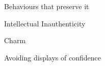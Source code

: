 \documentclass[aspectratio=169]{beamer}
\begin{document}
\begin{frame}
  \begin{center}
    \Huge Behaviours that preserve it
  \end{center}
\end{frame}

\begin{frame}
  \begin{center}
    \Huge Intellectual Inauthenticity
    \\ \small \cite{clanceimes78}
  \end{center}
\end{frame}

\begin{frame}
  \begin{center}
    \Huge Charm
    \\ \small \cite{clanceimes78}
  \end{center}
\end{frame}

\begin{frame}
  \begin{center}
    \Huge Avoiding displays of confidence
    \\ \small \cite{clanceimes78}
  \end{center}
\end{frame}
\end{document}
